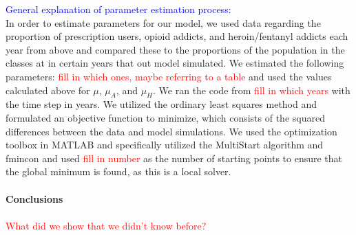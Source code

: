 \documentclass[12pt]{article}
\begin{document}
\textcolor{blue}{General explanation of parameter estimation process:} \\
In order to estimate parameters for our model, we used data regarding the proportion of prescription users, opioid addicts, and heroin/fentanyl addicts each year from above and compared these to the proportions of the population in the classes at in certain years that out model simulated. We estimated the following parameters: \textcolor{red}{fill in which ones, maybe referring to a table} and used the values calculated above for $\mu$, $\mu_A$, and $\mu_H.$ We ran the code from \textcolor{red}{fill in which years} with the time step in years. We utilized the ordinary least squares method and formulated an objective function to minimize, which consists of the squared differences between the data and model simulations. We used the optimization toolbox in MATLAB and specifically utilized the MultiStart algorithm and fmincon and used \textcolor{red}{fill in number} as the number of starting points to ensure that the global minimum is found, as this is a local solver. \\ \\
\textbf{Conclusions} \\ \\
 \textcolor{red}{What did we show that we didn't know before?}



\pagebreak



 
\end{document}
